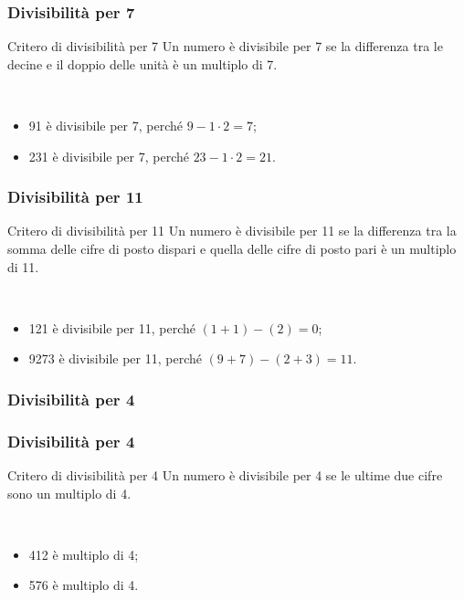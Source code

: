 \documentclass[]{beamer}
\theoremstyle{plain}
\begin{document}
\begin{frame}
\frametitle{Divisibilità per 7}
\begin{block}{Critero di divisibilità per 7}
  Un numero è divisibile per 7 se la differenza tra le decine e il doppio delle unità è un multiplo di 7.
\end{block}\pause

~

\begin{itemize}
  \item 91 è divisibile per 7, perché $ 9- 1 \cdot 2 = 7 $;\pause
  \item 231 è divisibile per 7, perché $ 23 - 1 \cdot 2 = 21 $.
\end{itemize}
\end{frame}




\begin{frame}
\frametitle{Divisibilità per 11}
\begin{block}{Critero di divisibilità per 11}
  Un numero è divisibile per 11 se la differenza tra la somma delle cifre di posto dispari e quella delle cifre di posto pari è un multiplo di 11.
\end{block}\pause

~

\begin{itemize}
  \item 121 è divisibile per 11, perché $ (1+1) - (2) = 0 $;\pause
  \item 9273 è divisibile per 11, perché $ (9+7) - (2+3) = 11 $.
\end{itemize}
  

\end{frame}




\begin{frame}
\frametitle{Divisibilità per 4}
\frametitle{Divisibilità per 4}
\begin{block}{Critero di divisibilità per 4}
  Un numero è divisibile per 4 se le ultime due cifre sono un multiplo di 4.
\end{block}\pause

~

\begin{itemize}
  \item 412 è multiplo di 4;\pause
  \item 576 è multiplo di 4.
\end{itemize}
\end{frame}
\end{document}
